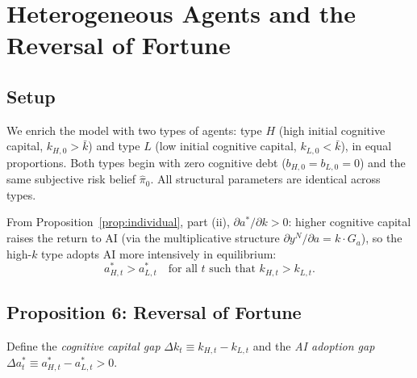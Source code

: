 \documentclass[12pt]{article}
\begin{document}
\section{Heterogeneous Agents and the Reversal of Fortune}
\label{sec:hetero}

\subsection{Setup}

We enrich the model with two types of agents: type $H$ (high initial cognitive capital,
$k_{H,0} > \bar k$) and type $L$ (low initial cognitive capital, $k_{L,0} < \bar k$),
in equal proportions. Both types begin with zero cognitive debt ($b_{H,0} = b_{L,0} = 0$)
and the same subjective risk belief $\hat\pi_0$. All structural parameters are identical
across types.

From Proposition~\ref{prop:individual}, part (ii), $\partial a^*/\partial k > 0$:
higher cognitive capital raises the return to AI (via the multiplicative structure
$\partial y^N/\partial a = k \cdot G_a$), so the high-$k$ type adopts AI more
intensively in equilibrium:
\begin{equation}
a_{H,t}^* > a_{L,t}^* \quad \text{for all } t \text{ such that } k_{H,t} > k_{L,t}.
\label{eq:hetero_ranking}
\end{equation}

\subsection{Proposition 6: Reversal of Fortune}

Define the \emph{cognitive capital gap} $\Delta k_t \equiv k_{H,t} - k_{L,t}$
and the \emph{AI adoption gap} $\Delta a_t^* \equiv a_{H,t}^* - a_{L,t}^* > 0$.
\end{document}
